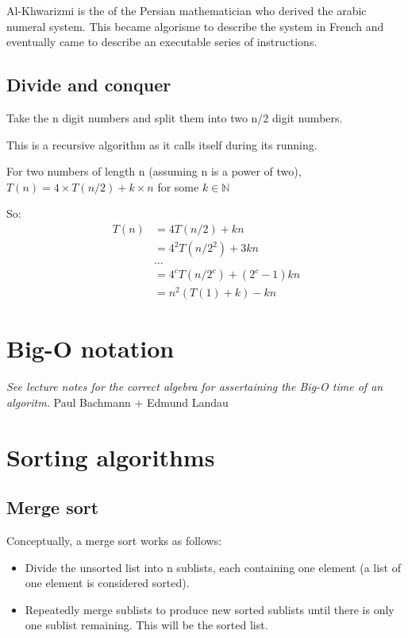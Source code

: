 Al-Khwarizmi is the of the Persian mathematician who derived the arabic
numeral system. This became algorisme to describe the system in French
and eventually came to describe an executable series of instructions.

\hypertarget{divide-and-conquer}{%
\subsection{Divide and conquer}\label{divide-and-conquer}}

Take the n digit numbers and split them into two n/2 digit numbers.

This is a recursive algorithm as it calls itself during its running.

For two numbers of length n (assuming n is a power of two), $T(n) = 4 
\times T(n/2) + k \times n$ for some $ k \in \mathbb{N}$

So:
\begin{align*}
	T(n) &= 4 T(n/2) + kn \\&= 4^2 T(n/2^2) + 3kn \\&\ldots{} \\&= 4^{c} 
	T(n/2^c) + (2^c - 1)kn\\& = n^2 ( T(1) + k ) - kn
\end{align*}

\hypertarget{big-o-notation}{%
\section{Big-O notation}\label{big-o-notation}}

\emph{See lecture notes for the correct algebra for assertaining the
Big-O time of an algoritm.}
Paul Bachmann + Edmund Landau
\hypertarget{sorting-algorithms}{%
\section{Sorting algorithms}\label{sorting-algorithms}}

\hypertarget{merge-sort}{%
\subsection{Merge sort}\label{merge-sort}}

Conceptually, a merge sort works as follows:

\begin{itemize}
\tightlist
\item
  Divide the unsorted list into n sublists, each containing one element
  (a list of one element is considered sorted).
\item
  Repeatedly merge sublists to produce new sorted sublists until there
  is only one sublist remaining. This will be the sorted list.
\end{itemize}

